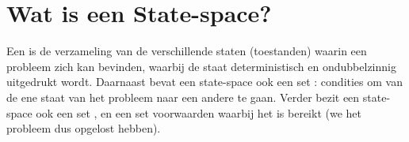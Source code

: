 \section{Wat is een State-space?}
Een  is de verzameling van de verschillende staten (toestanden) waarin een probleem zich kan bevinden, waarbij de staat deterministisch en ondubbelzinnig uitgedrukt wordt. Daarnaast bevat een state-space ook een set : condities om van de ene staat van het probleem naar een andere te gaan. Verder bezit een state-space ook een set , en een set voorwaarden waarbij het  is bereikt (we het probleem dus opgelost hebben).
\paragraph{}
